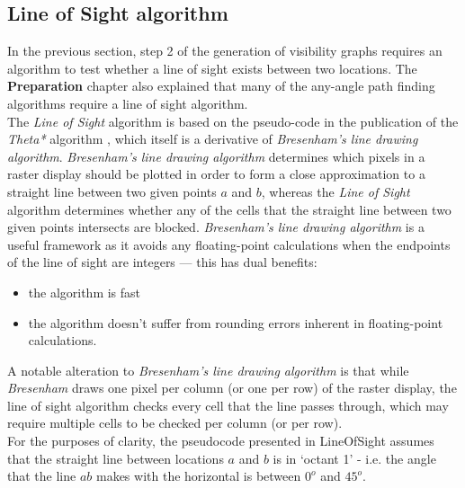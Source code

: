 \documentclass[12pt,notitlepage]{report}
\begin{document}
\subsection{Line of Sight algorithm}
In the previous section, step 2 of the generation of visibility graphs requires an algorithm to test whether a line of sight exists between two locations. The {\bfseries Preparation} chapter also explained that many of the any-angle path finding algorithms require a line of sight algorithm.\\

\noindent
The {\em Line of Sight} algorithm is based on the pseudo-code in the publication of the {\em Theta*} algorithm \cite{Daniel10}, which itself is a derivative of {\em Bresenham's line drawing algorithm}\cite{Bresenham65}. {\em Bresenham's line drawing algorithm} determines which pixels in a raster display should be plotted in order to form a close approximation to a straight line between two given points $a$ and $b$, whereas the {\em Line of Sight} algorithm determines whether any of the cells that the straight line between two given points intersects are blocked. {\em Bresenham's line drawing algorithm} is a useful framework as it avoids any floating-point calculations when the endpoints of the line of sight are integers --- this has dual benefits:
\begin{itemize}
\item the algorithm is fast
\item the algorithm doesn't suffer from rounding errors inherent in floating-point calculations. 
\end{itemize}
\noindent
A notable alteration to {\em Bresenham's line drawing algorithm} is that while {\em Bresenham} draws one pixel per column (or one per row) of the raster display, the line of sight algorithm checks every cell that the line passes through, which may require multiple cells to be checked per column (or per row).\\

\noindent
For the purposes of clarity, the pseudocode presented in {\sc LineOfSight} assumes that the straight line between locations $a$ and $b$ is in `octant 1' - i.e. the angle that the line $ab$ makes with the horizontal is between $0^{o}$ and $45^{o}$.\\
\end{document}
